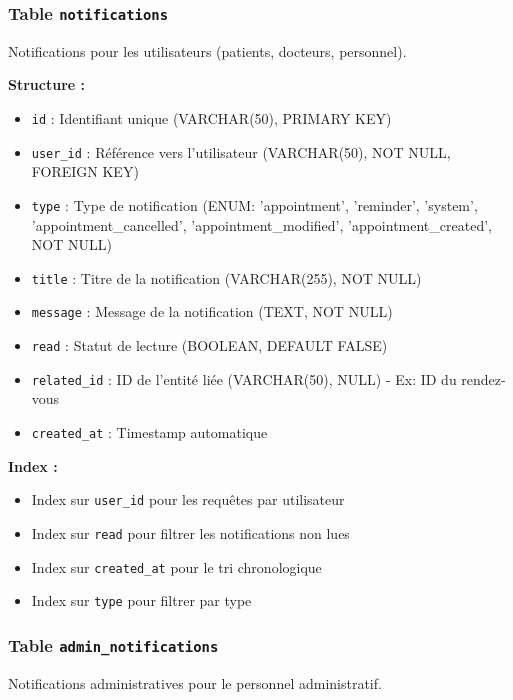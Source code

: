 \documentclass[12pt,a4paper]{report}
\begin{document}
\subsubsection{Table \texttt{notifications}}

Notifications pour les utilisateurs (patients, docteurs, personnel).

\textbf{Structure :}
\begin{itemize}
    \item \texttt{id} : Identifiant unique (VARCHAR(50), PRIMARY KEY)
    \item \texttt{user\_id} : Référence vers l'utilisateur (VARCHAR(50), NOT NULL, FOREIGN KEY)
    \item \texttt{type} : Type de notification (ENUM: 'appointment', 'reminder', 'system', 'appointment\_cancelled', 'appointment\_modified', 'appointment\_created', NOT NULL)
    \item \texttt{title} : Titre de la notification (VARCHAR(255), NOT NULL)
    \item \texttt{message} : Message de la notification (TEXT, NOT NULL)
    \item \texttt{read} : Statut de lecture (BOOLEAN, DEFAULT FALSE)
    \item \texttt{related\_id} : ID de l'entité liée (VARCHAR(50), NULL) - Ex: ID du rendez-vous
    \item \texttt{created\_at} : Timestamp automatique
\end{itemize}

\textbf{Index :}
\begin{itemize}
    \item Index sur \texttt{user\_id} pour les requêtes par utilisateur
    \item Index sur \texttt{read} pour filtrer les notifications non lues
    \item Index sur \texttt{created\_at} pour le tri chronologique
    \item Index sur \texttt{type} pour filtrer par type
\end{itemize}

\subsubsection{Table \texttt{admin\_notifications}}

Notifications administratives pour le personnel administratif.
\end{document}

